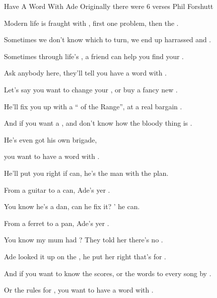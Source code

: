 \begin{SBSong}{Have A Word With Ade}
  {Originally there were 6 verses}
  {Phil Forshutt}
  \begin{SBVerse}
	Modern life is fraught with , first one problem, \WBLineBrk then the .
	
	Sometimes we don't know which  to turn, we end up harrassed and .
	
	Sometimes through life's , a friend can help you \WBLineBrk find your .
	
	Ask anybody  here, they'll tell you have a word with . 
	
	Let's say you want to change your , or buy a fancy new .
	
	He'll fix you up with a `` of the Range'', at a real bargain .
	
	And if you want a , and don't know how \WBLineBrk the bloody thing is .
	
	He's even got his own  brigade, 

    you want to have a word with . 
  \end{SBVerse}
  \begin{SBChorus}
    He'll put you right if  can, he's the man with \WBLineBrk the  plan.
    
    From a guitar to a  can, Ade's yer .
    
    You know he's a  dan, can he fix it? ' he can.
    
    From a ferret to a  pan, Ade's yer . 
  \end{SBChorus}
  \begin{SBVerse}
    You know my mum had ?  They told her there's no .
    
    Ade looked it up on the , he put her right that's for .
    
    And if you want to know the  scores, or the words to every song by .
    
    Or the rules for , you want to have a word with . 
    

\end{SBVerse}
\end{SBSong}
